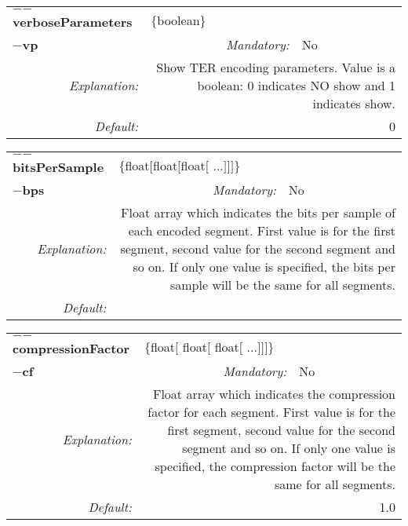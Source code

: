 \begin{center}\begin{tabular}{|rr|rlrl|}
\hline
\multicolumn{2}{|l|}{\textbf{$-$$-$verboseParameters}} & \multicolumn{4}{|l|}{$\{$boolean$\}$} \\
\cline{3-6}
\multicolumn{2}{|l|}{\textbf{$-$vp}} & \emph{Mandatory:} & No & &  \\
\hline
\emph{Explanation:} & \multicolumn{5}{|p{12cm}|}{Show TER encoding parameters. Value is a boolean: 0 indicates NO show and 1 indicates show.} \\
\hline
\emph{Default:} & \multicolumn{5}{|p{12cm}|}{0 } \\
\hline
\end{tabular}\end{center}
\begin{center}\begin{tabular}{|rr|rlrl|}
\hline
\multicolumn{2}{|l|}{\textbf{$-$$-$bitsPerSample}} & \multicolumn{4}{|l|}{$\{$float$[$float$[$float$[$ ...$]$$]$$]$$\}$} \\
\cline{3-6}
\multicolumn{2}{|l|}{\textbf{$-$bps}} & \emph{Mandatory:} & No & &  \\
\hline
\emph{Explanation:} & \multicolumn{5}{|p{12cm}|}{Float array which indicates the bits per sample of each encoded segment. First value is for the first segment, second value for the second segment and so on. If only one value is specified, the bits per sample will be the same for all segments.} \\
\hline
\emph{Default:} & \multicolumn{5}{|p{12cm}|}{ } \\
\hline
\end{tabular}\end{center}
\begin{center}\begin{tabular}{|rr|rlrl|}
\hline
\multicolumn{2}{|l|}{\textbf{$-$$-$compressionFactor}} & \multicolumn{4}{|l|}{$\{$float$[$ float$[$ float$[$ ...$]$$]$$]$$\}$} \\
\cline{3-6}
\multicolumn{2}{|l|}{\textbf{$-$cf}} & \emph{Mandatory:} & No & &  \\
\hline
\emph{Explanation:} & \multicolumn{5}{|p{12cm}|}{Float array which indicates the compression factor for each segment. First value is for the first segment, second value for the second segment and so on. If only one value is specified, the compression factor will be the same for all segments.} \\
\hline
\emph{Default:} & \multicolumn{5}{|p{12cm}|}{1.0 } \\
\hline
\end{tabular}\end{center}
